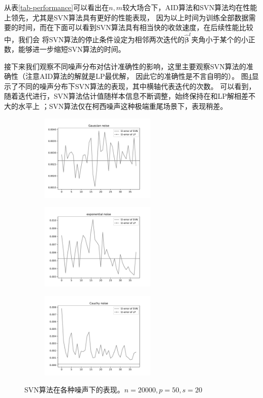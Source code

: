 从表\ref{tab-performance}可以看出在$n,m$较大场合下，AID算法和SVN算法均在性能上领先，尤其是SVN算法具有更好的性能表现，
因为以上时间为训练全部数据需要的时间，而在下面可以看到SVN算法具有相当快的收敛速度，在后续性能比较中，我们会
将SVN算法的停止条件设定为相邻两次迭代的$\hat{\bm{\beta}}^t$夹角小于某个的小正数，能够进一步缩短SVN算法的时间。

接下来我们观察不同噪声分布对估计准确性的影响，这里主要观察SVN算法的准确性（注意AID算法的解就是LP最优解，
因此它的准确性是不言自明的）。
图\ref{svn-noise}显示了不同的噪声分布下SVN算法的表现，其中横轴代表迭代的次数。
可以看到，随着迭代进行，SVN算法估计值随样本信息不断调整，始终保持在和LP解相差不大的水平上
；SVN算法仅在柯西噪声这种极端重尾场景下，表现稍差。

\begin{figure}[H]
    \centering
    \begin{subfigure}[t]{0.3\textwidth}\label{svn-demo1}
    \includegraphics[width=5.5cm]{pics/chapter2/gaussian-svn.pdf}
    \end{subfigure}
    \begin{subfigure}[t]{0.3\textwidth}\label{svn-demo2}
    \includegraphics[width=5.5cm]{pics/chapter2/exp-svn.pdf}
    \end{subfigure}
    \begin{subfigure}[t]{0.3\textwidth}\label{svn-demo3}
    \includegraphics[width=5.5cm]{pics/chapter2/cauchy-svn.pdf}
    \end{subfigure}
    \caption{ \small SVN算法在各种噪声下的表现。$n=20000,p=50,s=20$}
    \label{svn-noise}
\end{figure}

